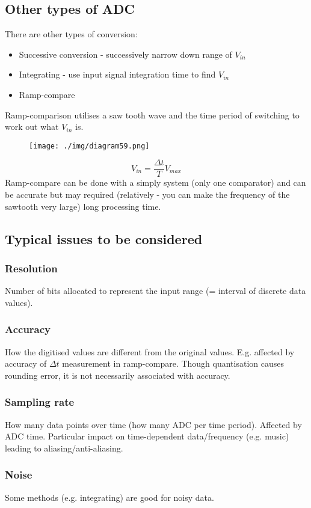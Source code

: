 \subsection{Other types of ADC}
There are other types of conversion:
\begin{itemize}
  \item Successive conversion - successively narrow down range of $V_{in}$
  \item Integrating - use input signal integration time to find $V_{in}$
  \item Ramp-compare
\end{itemize}
Ramp-comparison utilises a saw tooth wave and the time period of switching to work out what $V_{in}$ is.
\begin{figure}[H]
  \centering
  \texttt{[image: ./img/diagram59.png]}
\end{figure}
\begin{equation}
  V_{in} = \frac{\Delta t}{T} V_{max}
\end{equation}
Ramp-compare can be done with a simply system (only one comparator) and can be accurate but may required (relatively - you can make the frequency of the sawtooth very large) long processing time.
\subsection{Typical issues to be considered}
\subsubsection*{Resolution}
Number of bits allocated to represent the input range (= interval of discrete data values).
\subsubsection*{Accuracy}
How the digitised values are different from the original values. E.g. affected by accuracy of $\Delta t$ measurement in ramp-compare. Though quantisation causes rounding error, it is not necessarily associated with accuracy.
\subsubsection*{Sampling rate}
How many data points over time (how many ADC per time period). Affected by ADC time. Particular impact on time-dependent data/frequency (e.g. music) leading to aliasing/anti-aliasing.
\subsubsection*{Noise}
Some methods (e.g. integrating) are good for noisy data.
